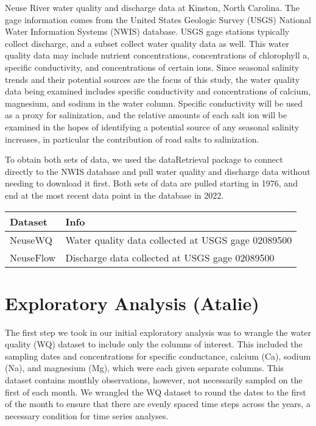 \documentclass[
  12pt,
]{article}
\begin{document}
Neuse River water quality and discharge data at Kinston, North Carolina.
The gage information comes from the United States Geologic Survey (USGS)
National Water Information Systems (NWIS) database. USGS gage stations
typically collect discharge, and a subset collect water quality data as
well. This water quality data may include nutrient concentrations,
concentrations of chlorophyll a, specific conductivity, and
concentrations of certain ions. Since seasonal salinity trends and their
potential sources are the focus of this study, the water quality data
being examined includes specific conductivity and concentrations of
calcium, magnesium, and sodium in the water column. Specific
conductivity will be used as a proxy for salinization, and the relative
amounts of each salt ion will be examined in the hopes of identifying a
potential source of any seasonal salinity increases, in particular the
contribution of road salts to salinization.

To obtain both sets of data, we used the dataRetrieval package to
connect directly to the NWIS database and pull water quality and
discharge data without needing to download it first. Both sets of data
are pulled starting in 1976, and end at the most recent data point in
the database in 2022.

\begin{longtable}[]{@{}ll@{}}
\toprule
Dataset & Info \\
\midrule
\endhead
NeuseWQ & Water quality data collected at USGS gage 02089500 \\
NeuseFlow & Discharge data collected at USGS gage 02089500 \\
\bottomrule
\end{longtable}

\newpage

\hypertarget{exploratory-analysis-atalie}{%
\section{Exploratory Analysis
(Atalie)}\label{exploratory-analysis-atalie}}

The first step we took in our initial exploratory analysis was to
wrangle the water quality (WQ) dataset to include only the columns of
interest. This included the sampling dates and concentrations for
specific conductance, calcium (Ca), sodium (Na), and magnesium (Mg),
which were each given separate columns. This dataset contains monthly
observations, however, not necessarily sampled on the first of each
month. We wrangled the WQ dataset to round the dates to the first of the
month to ensure that there are evenly spaced time steps across the
years, a necessary condition for time series analyses.
\end{document}
